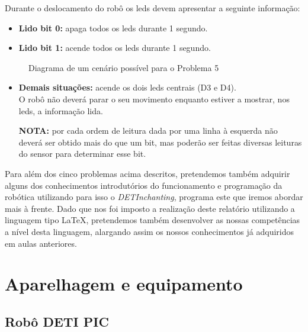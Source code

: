 \documentclass[a4paper, 12pt, onecolumn, oneside]{report}
\begin{document}
\begin{itemize}
Durante o deslocamento do robô os leds devem apresentar a seguinte informação:

\begin{itemize}  
  \item \textbf{Lido bit 0:} apaga todos os leds durante 1 segundo.
   \item \textbf{Lido bit 1:} acende todos os leds durante 1 segundo.
   
\end{itemize}


\begin{figure}[H] 
\center{\texttt{[image: ex5]}}
\caption{Diagrama de um cenário possível para o Problema 5}
\label{fig:speciation}
\end{figure}


\begin{itemize}
\item \textbf{Demais situações:} acende os dois leds centrais (D3 e D4).
\\

O robô não deverá parar o seu movimento enquanto estiver a mostrar, nos leds, a informação lida.

\textbf{NOTA:} por cada ordem de leitura dada por uma linha à esquerda não deverá ser obtido mais do que um bit, mas poderão ser feitas diversas leituras do sensor para determinar esse bit. 


\end{itemize}




\end{itemize}






Para além dos cinco problemas acima descritos, pretendemos também adquirir alguns dos conhecimentos introdutórios do funcionamento e programação da robótica utilizando para isso o \emph{DETInchanting}, programa este que iremos abordar mais à frente. Dado que nos foi imposto a realização deste relatório utilizando a linguagem tipo \LaTeX, pretendemos também desenvolver as nossas competências a nível desta linguagem, alargando assim os nossos conhecimentos já adquiridos em aulas anteriores.


\newpage
\section{Aparelhagem e equipamento}



\subsection{Robô DETI PIC}
\end{document}
